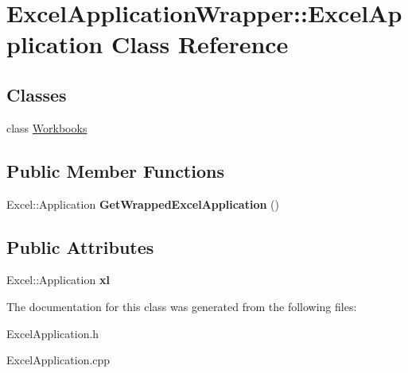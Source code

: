 \hypertarget{class_excel_application_wrapper_1_1_excel_application}{}\section{Excel\+Application\+Wrapper\+:\+:Excel\+Application Class Reference}
\label{class_excel_application_wrapper_1_1_excel_application}
\subsection*{Classes}
\begin{DoxyCompactItemize}
\item 
class \hyperlink{class_excel_application_wrapper_1_1_excel_application_1_1_workbooks}{Workbooks}
\end{DoxyCompactItemize}
\subsection*{Public Member Functions}
\begin{DoxyCompactItemize}
\item 
\hypertarget{class_excel_application_wrapper_1_1_excel_application_aeda6c047f9daed63f342c0fd074a2b08}{}Excel\+::\+Application {\bfseries Get\+Wrapped\+Excel\+Application} ()\label{class_excel_application_wrapper_1_1_excel_application_aeda6c047f9daed63f342c0fd074a2b08}

\end{DoxyCompactItemize}
\subsection*{Public Attributes}
\begin{DoxyCompactItemize}
\item 
\hypertarget{class_excel_application_wrapper_1_1_excel_application_a2c8b69990a092a3a645ea14fb16b54dd}{}Excel\+::\+Application {\bfseries xl}\label{class_excel_application_wrapper_1_1_excel_application_a2c8b69990a092a3a645ea14fb16b54dd}

\end{DoxyCompactItemize}


The documentation for this class was generated from the following files\+:\begin{DoxyCompactItemize}
\item 
Excel\+Application.\+h\item 
Excel\+Application.\+cpp\end{DoxyCompactItemize}
